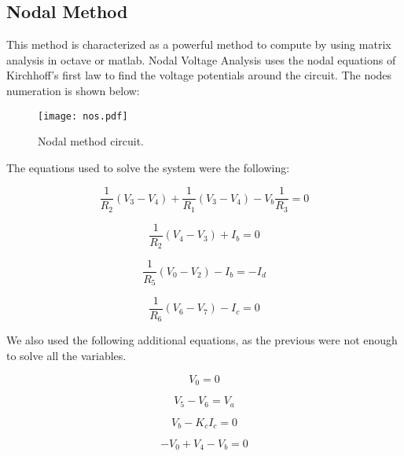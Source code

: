 \subsection{Nodal Method}

This method is characterized as a powerful method to compute by using matrix analysis in octave or matlab. Nodal Voltage Analysis uses the nodal equations of Kirchhoff’s first law to find the voltage potentials around the circuit. The nodes numeration is shown below:

\begin{figure}[H] \centering
\texttt{[image: nos.pdf]}
\caption{Nodal method circuit.}
\label{fig:nos}
\end{figure}

The equations used to solve the system were the following:

\begin{equation}
  \frac{1}{R_2} (V_3-V_4) + \frac{1}{R_1} (V_3-V_4) - V_b \frac{1}{R_3} = 0
  \label{eq6}
\end{equation}

\begin{equation}
  \frac{1}{R_2} (V_4-V_3) + I_b = 0
  \label{eq7}
\end{equation}

\begin{equation}
  \frac{1}{R_5} (V_0-V_2) - I_b = -I_d
  \label{eq8}
\end{equation}

\begin{equation}
  \frac{1}{R_6} (V_6-V_7) - I_c = 0
  \label{eq9}
\end{equation}

We also used the following additional equations, as the previous were not enough to solve all the variables.

\begin{equation}
  V_0 = 0
  \label{eq10}
\end{equation}

\begin{equation}
  V_5 - V_6 = V_a
  \label{eq11}
\end{equation}

\begin{equation}
  V_b - K_c I_c = 0
  \label{eq12}
\end{equation}

\begin{equation}
  -V_0 + V_4 - V_b = 0
  \label{eq13}
\end{equation}

